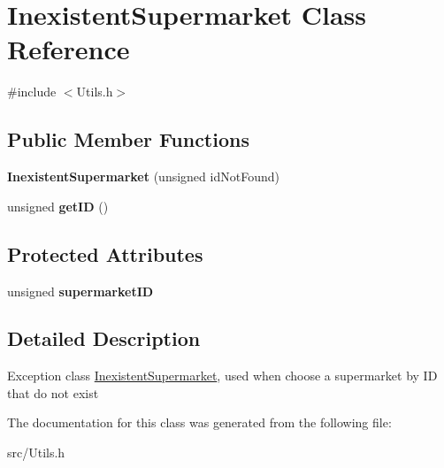 \hypertarget{class_inexistent_supermarket}{}\section{Inexistent\+Supermarket Class Reference}
\label{class_inexistent_supermarket}


{\ttfamily \#include $<$Utils.\+h$>$}

\subsection*{Public Member Functions}
\begin{DoxyCompactItemize}
\item 
\hypertarget{class_inexistent_supermarket_aba9e4ad784b4a61d3b4235a95ed7ceee}{}\label{class_inexistent_supermarket_aba9e4ad784b4a61d3b4235a95ed7ceee} 
{\bfseries Inexistent\+Supermarket} (unsigned id\+Not\+Found)
\item 
\hypertarget{class_inexistent_supermarket_ac53ba93355789eec0696402ce43dd08f}{}\label{class_inexistent_supermarket_ac53ba93355789eec0696402ce43dd08f} 
unsigned {\bfseries get\+ID} ()
\end{DoxyCompactItemize}
\subsection*{Protected Attributes}
\begin{DoxyCompactItemize}
\item 
\hypertarget{class_inexistent_supermarket_a4cb6a8af15ef739abac5ffbe5b1dfc62}{}\label{class_inexistent_supermarket_a4cb6a8af15ef739abac5ffbe5b1dfc62} 
unsigned {\bfseries supermarket\+ID}
\end{DoxyCompactItemize}


\subsection{Detailed Description}
Exception class \hyperlink{class_inexistent_supermarket}{Inexistent\+Supermarket}, used when choose a supermarket by ID that do not exist 

The documentation for this class was generated from the following file\+:\begin{DoxyCompactItemize}
\item 
src/Utils.\+h\end{DoxyCompactItemize}
